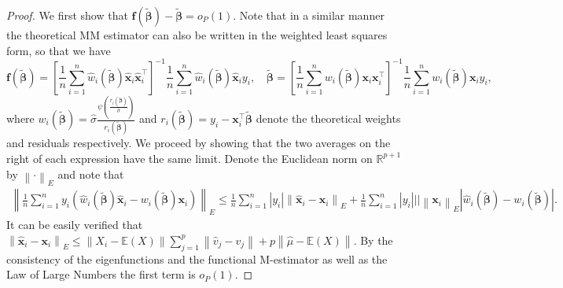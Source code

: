 \documentclass[11pt]{article}
\begin{document}
\begin{proof}
We first show that $\mathbf{f} ( \boldsymbol{\widetilde{\beta}}) -\boldsymbol{ \widetilde{\beta} }  = o_{P}(1)$. Note that in a similar manner the theoretical MM estimator can also be written in the weighted least squares form, so that we have
\begin{equation*}
\mathbf{f} (\boldsymbol{\widetilde{\beta}} ) = \left[ \frac{1}{n} \sum_{i=1}^n \widehat{w}_i ( \boldsymbol{\widetilde{\beta}} ) \mathbf{\widehat{x}}_i \mathbf{\widehat{x}}_i^{\top} \right]^{-1}\frac{1}{n} \sum_{i=1}^n \widehat{w}_i ( \boldsymbol{\widetilde{\beta}}) \mathbf{\widehat{x}}_i y_i, 
\quad 
\boldsymbol{\widetilde{\beta}} = \left[ \frac{1}{n} \sum_{i=1}^n  w_i ( \boldsymbol{\widetilde{\beta}} ) \mathbf{x}_i \mathbf{x}_i^{\top} \right]^{-1} \frac{1}{n} \sum_{i=1}^n w_i ( \boldsymbol{\widetilde{\beta}}) \mathbf{x}_i y_i,
\end{equation*}
where $w_i\left(\boldsymbol{\widetilde{\beta}} \right) = \widehat{\sigma} \frac{ \psi \left( \frac{r_i \left( \boldsymbol{\widetilde{\beta}} \right)}{\widehat{\sigma}} \right) }{ r_i \left( \boldsymbol{\widetilde{\beta}} \right)} $ and $r_i ( \boldsymbol{\widetilde{\beta}}) = y_i - \mathbf{x}_i^{\top} \boldsymbol{\widetilde{\beta}}$ denote the theoretical weights and residuals respectively. We proceed by showing that the two averages on the right of each expression have the same limit. Denote the Euclidean norm on $\mathbb{R}^{p+1}$ by $\left\|\cdot \right\|_{E}$ and note that
\begin{align*}
\left\| \frac{1}{n} \sum_{i=1}^n y_i \left(\widehat{w}_i ( \boldsymbol{\widetilde{\beta}}) \mathbf{\widehat{x}}_i - w_i ( \boldsymbol{\widetilde{\beta}}) \mathbf{x}_i  \right) \right\|_{E} 
\leq \frac{1}{n} \sum_{i=1}^n \left|y_i \right| \left\| \mathbf{\widehat{x}}_i - \mathbf{x}_i \right\|_{E} + \frac{1}{n} \sum_{i=1}^n \left| y_i \right| \left|  \right| \left\| \mathbf{x}_i \right\|_{E} \left| \widehat{w}_i ( \boldsymbol{\widetilde{\beta}}) - w_i ( \boldsymbol{\widetilde{\beta}}) \right|.
\end{align*}
It can be easily verified that $\left\|\mathbf{\widehat{x}}_i - \mathbf{x}_i  \right\|_{E} \leq \left\| X_i -\mathbb{E}(X) \right\| \sum_{j=1}^p \left\| \widehat{v}_j -v_j \right\| + p \left\|\widehat{\mu}-\mathbb{E}(X) \right\|$. By the consistency of the eigenfunctions and the functional M-estimator as well as the Law of Large Numbers the first term is $o_{P}(1)$.


\end{proof}
\end{document}

